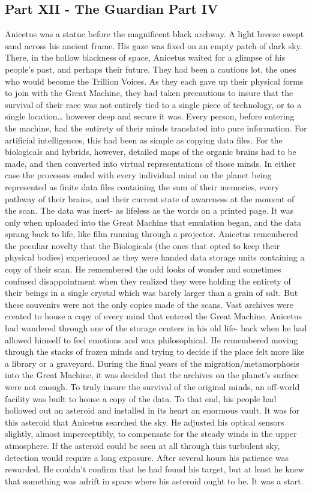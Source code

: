 \documentclass[a4paper]{article}
\begin{document}
\subsection{Part XII - The Guardian Part IV}
Anicetus was a statue before the magnificent black archway. A light breeze swept sand across his ancient frame. His gaze was fixed on an empty patch of dark sky. There, in the hollow blackness of space, Anicetus waited for a glimpse of his people’s past, and perhaps their future.
They had been a cautious lot, the ones who would become the Trillion Voices. As they each gave up their physical forms to join with the Great Machine, they had taken precautions to insure that the survival of their race was not entirely tied to a single piece of technology, or to a single location… however deep and secure it was.
Every person, before entering the machine, had the entirety of their minds translated into pure information. For artificial intelligences, this had been as simple as copying data files. For the biologicals and hybrids, however, detailed maps of the organic brains had to be made, and then converted into virtual representations of those minds. In either case the processes ended with every individual mind on the planet being represented as finite data files containing the sum of their memories, every pathway of their brains, and their current state of awareness at the moment of the scan.
The data was inert- as lifeless as the words on a printed page. It was only when uploaded into the Great Machine that emulation began, and the data sprang back to life, like film running through a projector. Anicetus remembered the peculiar novelty that the Biologicals (the ones that opted to keep their physical bodies) experienced as they were handed data storage units containing a copy of their scan. He remembered the odd looks of wonder and sometimes confused disappointment when they realized they were holding the entirety of their beings in a single crystal which was barely larger than a grain of salt. But these souvenirs were not the only copies made of the scans.
Vast archives were created to house a copy of every mind that entered the Great Machine. Anicetus had wandered through one of the storage centers in his old life- back when he had allowed himself to feel emotions and wax philosophical. He remembered moving through the stacks of frozen minds and trying to decide if the place felt more like a library or a graveyard.
During the final years of the migration/metamorphosis into the Great Machine, it was decided that the archives on the planet’s surface were not enough. To truly insure the survival of the original minds, an off-world facility was built to house a copy of the data. To that end, his people had hollowed out an asteroid and installed in its heart an enormous vault. It was for this asteroid that Anicetus searched the sky.
He adjusted his optical sensors slightly, almost imperceptibly, to compensate for the steady winds in the upper atmosphere. If the asteroid could be seen at all through this turbulent sky, detection would require a long exposure. After several hours his patience was rewarded. He couldn’t confirm that he had found his target, but at least he knew that something was adrift in space where his asteroid ought to be. It was a start.
\end{document}
